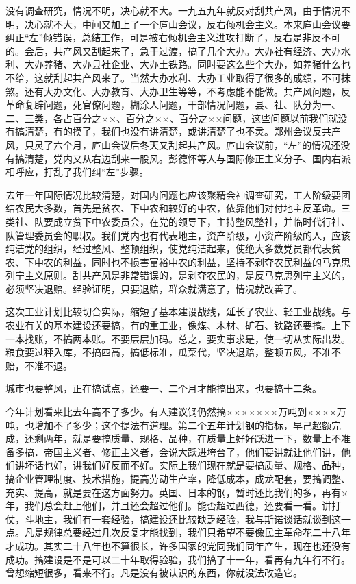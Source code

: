 没有调查研究，情况不明，决心就不大。一九五九年就反对刮共产风，由于情况不明，决心就不大，中间又加上了一个庐山会议，反右倾机会主义。本来庐山会议要纠正“左”倾错误，总结工作，可是被右倾机会主义进攻打断了，反右是非反不可的。会后，共产风又刮起来了，急于过渡，搞了几个大办。大办社有经济、大办水利、大办养猪、大办县社企业、大办土铁路。同时要这么些个大办，如养猪什么也不给，这就刮起共产风来了。当然大办水利、大办工业取得了很多的成绩，不可抹煞。还有大办文化、大办教育、大办卫生等等，不考虑能不能做。共产风问题，反革命复辟问题，死官僚问题，糊涂人问题，干部情况问题，县、社、队分为一、二、三类，各占百分之××、百分之××、百分之××问题，这些问题以前我们就没有搞清楚，有的摸了，我们也没有讲清楚，或讲清楚了也不灵。郑州会议反共产风，只灵了六个月，庐山会议后冬天又刮起共产风。庐山会议前，“左”的情况还没有搞清楚，党内又从右边刮来一股风。彭德怀等人与国际修正主义分子、国内右派相呼应，打乱了我们纠“左”步骤。

去年一年国际情况比较清楚，对国内问题也应该聚精会神调查研究，工人阶级要团结农民大多数，首先是贫农、下中农和较好的中农，依靠他们对付地主反革命。三类社、队要成立贫下中农委员会，在党的领导下，主持整风整社，并临时代行社、队管理委员会的职权。我们党内也有代表地主，资产阶级，小资产阶级的人，应该纯洁党的组织，经过整风、整顿组织，使党纯洁起来，使绝大多数党员都代表贫农、下中农的利益，同时也不损害富裕中农的利益，坚持不剥夺农民利益的马克思列宁主义原则。刮共产风是非常错误的，是剥夺农民的，是反马克思列宁主义的，必须坚决退赔。经验证明，只要退赔，群众就满意了，情况就改善了。

这次工业计划比较切合实际，缩短了基本建设战线，延长了农业、轻工业战线。与农业有关的基本建设还要搞，有的重工业，像煤、木材、矿石、铁路还要搞。上下一本找账，不搞两本账。不要层层加码。总之，要实事求是，使一切从实际出发。粮食要过秤入库，不搞四高，搞低标准，瓜菜代，坚决退赔，整顿五风，不准不赔，不准不退。

城市也要整风，正在搞试点，还要一、二个月才能搞出来，也要搞十二条。

今年计划看来比去年高不了多少。有人建议钢仍然搞×××××××万吨到××××万吨，也增加不了多少；这个提法有道理。第二个五年计划钢的指标，早己超额完成，还剩两年，就是要搞质量、规格、品种，在质量上好好跃进一下，数量上不准备多搞．帝国主义者、修正主义者，会说大跃进垮台了，他们要讲就让他们讲，他们讲坏话也好，讲我们好反而不好。实际上我们现在就是要搞质量、规格、品种，搞企业管理制度、技术措施，提高劳动生产率，降低成本，成龙配套，要搞调整、充实、提高，就是要在这方面努力。英国、日本的钢，暂时还比我们的多，再有×年，我们总会赶上他们，并且还会超过他们。能否超过西德，还要看一看。讲打仗，斗地主，我们有一套经验，搞建设还比较缺乏经验，我与斯诺谈话就谈到这一点。凡是规律总要经过几次反复才能找到，我们只希望不要像民主革命花二十八年才成功。其实二十八年也不算很长，许多国家的党同我们同年产生，现在也还没有成功。搞建设是不是可以二十年取得验验，我们搞了十一年，看再有九年行不行。曾想缩短很多，看来不行。凡是没有被认识的东西，你就没法改造它。

